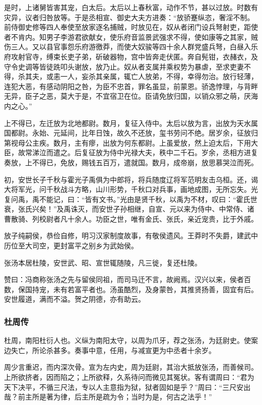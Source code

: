 \documentclass[]{article}
\begin{document}
是时，上诸舅皆害其宠，白太后。太后以上春秋富，动作不节，甚以过放。时数有灾异，议者归咎放等。于是丞相宣、御史大夫方进奏：``放骄蹇纵恣，奢淫不制。前侍御史修等四人奉使至放家逐名捕贼，时放见在，奴从者闭门设兵弩射吏，距使者不肯内。知男子李游君欲献女，使乐府音监景武强求不得，使如康等之其家，贼伤三人。又以县官事怨乐府游徼莽，而使大奴骏等四十余人群党盛兵弩，白昼入乐府攻射官寺，缚束长吏子弟，斫破器物，宫中皆奔走伏匿。奔自髡钳，衣赭衣，及守令史调等皆徒跣叩头谢放，放乃止。奴从者支属并乘权势为暴虐，至求吏妻不得，杀其夫，或恚一人，妄杀其亲属，辄亡人放弟，不得，幸得勿治。放行轻薄，连犯大恶，有感动阴阳之咎，为臣不忠首，罪名虽显，前蒙恩。骄逸悖理，与背畔无异，臣子之恶，莫大于是，不宜宿卫在位。臣请免放归国，以销众邪之萌，厌海内之心。''

上不得已，左迁放为北地都尉。数月，复征入侍中。太后以放为言，出放为天水属国都尉。永始、元延间，比年日蚀，故久不还放，玺书劳问不绝。居岁余，征放归第视母公主疾。数月，主有瘳，出放为何东都尉。上虽爱放，然上迫太后，下用大臣，故常涕泣而遣之。后复征放为侍中光禄大夫，秩中二千石。岁余，丞相方进复奏放，上不得已，免放，赐钱五百万，遣就国。数月，成帝崩，放思慕哭泣而死。

初，安世长子千秋与霍光子禹俱为中郎将，将兵随度辽将军范明友击乌桓。还，谒大将军光，问千秋战斗方略，山川形势，千秋口对兵事，画地成图，无所忘失。光复问禹，禹不能记，曰：``皆有文书。''光由是贤千秋，以禹为不材，叹曰：``霍氏世衰，张氏兴矣！''及禹诛灭，而安世子孙相继，自宣、元以来为侍中、中常侍、诸曹散骑、列校尉者凡十余人。功臣之世，唯有金氏、张氏，亲近宠贵，比于外戚。

放子纯嗣侯，恭俭自修，明习汉家制度故事，有敬侯遗风。王莽时不失爵，建武中历位至大司空，更封富平之别乡为武始侯。

张汤本居杜陵，安世武、昭、宣世辄随陵，凡三徙，复还杜陵。

赞曰：冯商称张汤之先与留侯同祖，而司马迁不言，故阙焉。汉兴以来，侯者百数，保国持宠，未有若富平者也。汤虽酷烈，及身蒙咎，其推贤扬善，固宜有后。安世履道，满而不溢。贺之阴德，亦有助云。

\hypertarget{header-n4692}{%
\subsubsection{杜周传}\label{header-n4692}}

杜周，南阳杜衍人也。义纵为南阳太守，以周为爪牙，荐之张汤，为廷尉史。使案边失亡，所论杀甚多。奏事中意，任用，与减宣更为中丞者十余岁。

周少言重迟，而内深次骨。宣为左内史，周为廷尉，其治大抵放张汤，而善候司。上所欲挤者，因而陷之；上所欲释，久系待问而微见其冤状。客有谓周曰：``君为天下决平，不循三尺法，专以人主意指为狱，狱者固如是乎？''周曰：``三尺安出哉？前主所是著为律，后主所是疏为令；当时为是，何古之法乎！''
\end{document}
